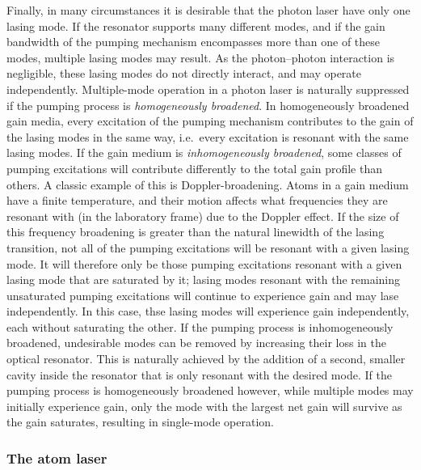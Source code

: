 Finally, in many circumstances it is desirable that the photon laser have only one lasing mode.  If the resonator supports many different modes, and if the gain bandwidth of the pumping mechanism encompasses more than one of these modes, multiple lasing modes may result.  As the photon--photon interaction is negligible, these lasing modes do not directly interact, and may operate independently.  Multiple-mode operation in a photon laser is naturally suppressed if the pumping process is \emph{homogeneously broadened}.  In homogeneously broadened gain media, every excitation of the pumping mechanism contributes to the gain of the lasing modes in the same way, i.e.\ every excitation is resonant with the same lasing modes.  If the gain medium is \emph{inhomogeneously broadened}, some classes of pumping excitations will contribute differently to the total gain profile than others.  A classic example of this is Doppler-broadening.  Atoms in a gain medium have a finite temperature, and their motion affects what frequencies they are resonant with (in the laboratory frame) due to the Doppler effect.  If the size of this frequency broadening is greater than the natural linewidth of the lasing transition, not all of the pumping excitations will be resonant with a given lasing mode.  It will therefore only be those pumping excitations resonant with a given lasing mode that are saturated by it; lasing modes resonant with the remaining unsaturated pumping excitations will continue to experience gain and may lase independently.  In this case, thse lasing modes will experience gain independently, each without saturating the other.  If the pumping process is inhomogeneously broadened, undesirable modes can be removed by increasing their loss in the optical resonator.  This is naturally achieved by the addition of a second, smaller cavity inside the resonator that is only resonant with the desired mode.  If the pumping process is homogeneously broadened however, while multiple modes may initially experience gain, only the mode with the largest net gain will survive as the gain saturates, resulting in single-mode operation.


\subsubsection{The atom laser}

